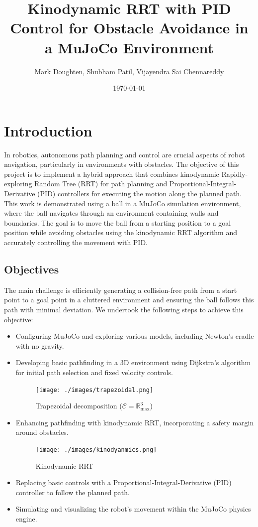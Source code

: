 \documentclass[12pt]{article}
\title{Kinodynamic RRT with PID Control for Obstacle Avoidance in a MuJoCo Environment}
\author{Mark Doughten, Shubham Patil, Vijayendra Sai Chennareddy}
\date{\today}
\begin{document}
\maketitle

\section{Introduction}
In robotics, autonomous path planning and control are crucial aspects of robot navigation, particularly in environments with obstacles. The objective of this project is to implement a hybrid approach that combines kinodynamic Rapidly-exploring Random Tree (RRT) for path planning and Proportional-Integral-Derivative (PID) controllers for executing the motion along the planned path. This work is demonstrated using a ball in a MuJoCo simulation environment, where the ball navigates through an environment containing walls and boundaries. The goal is to move the ball from a starting position to a goal position while avoiding obstacles using the kinodynamic RRT algorithm and accurately controlling the movement with PID.

\subsection{Objectives}
The main challenge is efficiently generating a collision-free path from a start point to a goal point in a cluttered environment and ensuring the ball follows this path with minimal deviation. We undertook the following steps to achieve this objective:
\begin{itemize}
    \item Configuring MuJoCo and exploring various models, including Newton’s cradle with no gravity.
    \item Developing basic pathfinding in a 3D environment using Dijkstra’s algorithm for initial path selection and fixed velocity controls.
    \begin{figure}[h!]
        \centering
        \texttt{[image: ./images/trapezoidal.png]}
        \caption{Trapezoidal decomposition (\(\mathcal{C} = \mathbb{R}^3_{\text{max}}\))}
        \label{fig:trapezoidal}
    \end{figure}
    \item Enhancing pathfinding with kinodynamic RRT, incorporating a safety margin around obstacles.
    \begin{figure}[h!]
        \centering
        \texttt{[image: ./images/kinodyanmics.png]}
        \caption{Kinodynamic RRT}
        \label{fig:kinodynamic}
    \end{figure}
    \item Replacing basic controls with a Proportional-Integral-Derivative (PID) controller to follow the planned path.
    \item Simulating and visualizing the robot’s movement within the MuJoCo physics engine.
\end{itemize}
\end{document}
